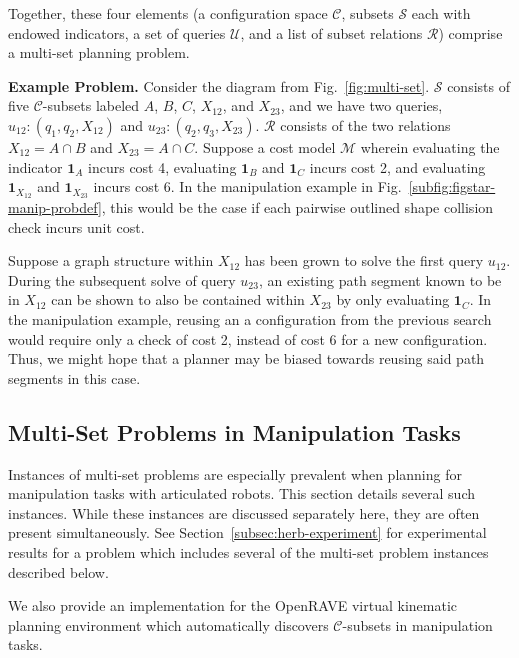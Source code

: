 Together, these four elements
(a configuration space $\mathcal{C}$,
subsets $\mathcal{S}$ each with endowed indicators,
a set of queries $\mathcal{U}$,
and a list of subset relations $\mathcal{R}$)
comprise a multi-set planning problem.

\textbf{Example Problem.}
Consider the diagram from Fig.~\ref{fig:multi-set}.
$\mathcal{S}$ consists of five $\mathcal{C}$-subsets labeled
$A$, $B$, $C$, $X_{12}$, and $X_{23}$,
and we have two queries,
$u_{12}: (q_1, q_2, X_{12})$
and
$u_{23}: (q_2, q_3, X_{23})$.
$\mathcal{R}$ consists of the two relations
$X_{12} = A \cap B$ and $X_{23} = A \cap C$.
Suppose a cost model $\mathcal{M}$
wherein evaluating the indicator
$\mathbf{1}_A$ incurs cost 4,
evaluating $\mathbf{1}_B$ and $\mathbf{1}_C$ incurs cost 2,
and evaluating $\mathbf{1}_{X_{12}}$ and $\mathbf{1}_{X_{23}}$
incurs cost 6.
In the manipulation example in
Fig.~\ref{subfig:figstar-manip-probdef},
this would be the case if each
pairwise outlined shape collision check incurs unit cost.

Suppose a graph structure within ${X_{12}}$ has been grown to solve
the first query $u_{12}$.
During the subsequent solve of query $u_{23}$,
an existing path segment known to be in ${X_{12}}$ can be shown to
also be contained within ${X_{23}}$ by only evaluating $\mathbf{1}_C$.
In the manipulation example,
reusing an a configuration from the previous search
would require only a check of cost 2,
instead of cost 6 for a new configuration.
Thus, we might hope that a planner may be biased towards reusing
said path segments in this case.

\subsection{Multi-Set Problems in Manipulation Tasks}
\label{sec:in-manipulation}

Instances of multi-set problems are especially prevalent when
planning for manipulation tasks with articulated robots.
This section details several such instances.
While these instances are discussed separately here,
they are often present simultaneously.
See Section~\ref{subsec:herb-experiment}
for experimental results for a problem
which includes several of the multi-set problem instances
described below.

We also provide an implementation for the
OpenRAVE \citep{diankov2010openrave}
virtual kinematic planning environment
which automatically discovers $\mathcal{C}$-subsets
in manipulation tasks.

